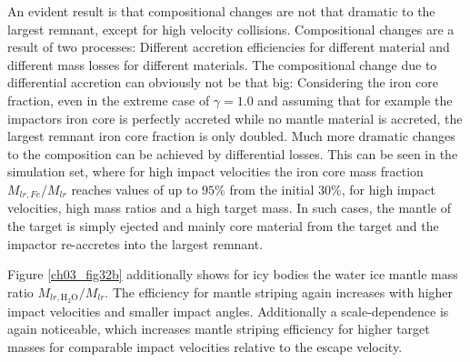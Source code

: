 An evident result is that compositional changes are not that dramatic to the largest remnant, except for high velocity collisions. Compositional changes are a result of two processes: Different accretion efficiencies for different material and different mass losses for different materials. The compositional change due to differential accretion can obviously not be that big: Considering the iron core fraction, even in the extreme case of $\gamma = 1.0$ and assuming that for example the impactors iron core is perfectly accreted while no mantle material is accreted, the largest remnant iron core fraction is only doubled. Much more dramatic changes to the composition can be achieved by differential losses. This can be seen in the \css simulation set, where for high impact velocities the iron core mass fraction $M_{lr, Fe} / M_{lr}$ reaches values of up to $95 \%$ from the initial $30\%$, for high impact velocities, high mass ratios and a high target mass. In such cases, the mantle of the target is simply ejected and mainly core material from the target and the impactor re-accretes into the largest remnant. 


Figure \ref{ch03_fig32b} additionally shows for icy bodies the water ice mantle mass ratio $M_{lr, \mathrm{H}_2 \mathrm{O}} / M_{lr}$. The efficiency for mantle striping again increases with higher impact velocities and smaller impact angles. Additionally a scale-dependence is again noticeable, which increases mantle striping efficiency for higher target masses for comparable impact velocities relative to the escape velocity.

